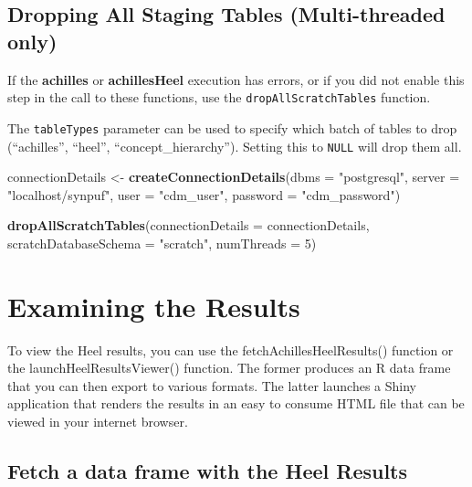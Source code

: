 \documentclass[]{article}
\newenvironment{Shaded}{\begin{snugshade}}{\end{snugshade}}
\newcommand{\KeywordTok}[1]{\textcolor[rgb]{0.13,0.29,0.53}{\textbf{#1}}}
\newcommand{\DataTypeTok}[1]{\textcolor[rgb]{0.13,0.29,0.53}{#1}}
\newcommand{\DecValTok}[1]{\textcolor[rgb]{0.00,0.00,0.81}{#1}}
\newcommand{\StringTok}[1]{\textcolor[rgb]{0.31,0.60,0.02}{#1}}
\newcommand{\NormalTok}[1]{#1}
\begin{document}
\subsection{Dropping All Staging Tables (Multi-threaded
only)}\label{dropping-all-staging-tables-multi-threaded-only}

If the \textbf{achilles} or \textbf{achillesHeel} execution has errors,
or if you did not enable this step in the call to these functions, use
the \texttt{dropAllScratchTables} function.

The \texttt{tableTypes} parameter can be used to specify which batch of
tables to drop (``achilles'', ``heel'', ``concept\_hierarchy''). Setting
this to \texttt{NULL} will drop them all.

\begin{Shaded}
\begin{Highlighting}[]
\NormalTok{connectionDetails <-}\StringTok{ }\KeywordTok{createConnectionDetails}\NormalTok{(}\DataTypeTok{dbms =} \StringTok{"postgresql"}\NormalTok{, }
                                             \DataTypeTok{server =} \StringTok{"localhost/synpuf"}\NormalTok{, }
                                             \DataTypeTok{user =} \StringTok{"cdm_user"}\NormalTok{, }
                                             \DataTypeTok{password =} \StringTok{"cdm_password"}\NormalTok{)}

\KeywordTok{dropAllScratchTables}\NormalTok{(}\DataTypeTok{connectionDetails =}\NormalTok{ connectionDetails, }
                     \DataTypeTok{scratchDatabaseSchema =} \StringTok{"scratch"}\NormalTok{, }\DataTypeTok{numThreads =} \DecValTok{5}\NormalTok{)}
\end{Highlighting}
\end{Shaded}

\section{Examining the Results}\label{examining-the-results}

To view the Heel results, you can use the fetchAchillesHeelResults()
function or the launchHeelResultsViewer() function. The former produces
an R data frame that you can then export to various formats. The latter
launches a Shiny application that renders the results in an easy to
consume HTML file that can be viewed in your internet browser.

\subsection{Fetch a data frame with the Heel
Results}\label{fetch-a-data-frame-with-the-heel-results}
\end{document}
